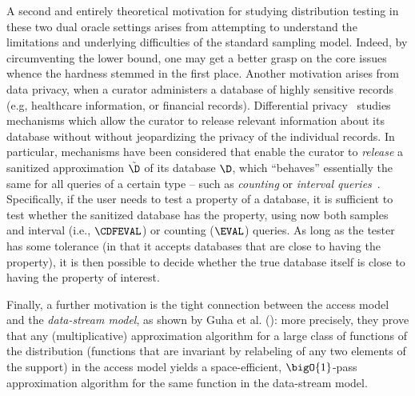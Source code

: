   A second and entirely theoretical motivation for studying distribution testing in these two dual oracle settings arises from attempting to understand the limitations and underlying difficulties of the standard sampling model. Indeed, by circumventing the lower bound, one may get a better grasp on the core issues whence the hardness stemmed in the first place.  
  Another motivation arises from data privacy, when a curator administers a database of highly sensitive records (e.g, healthcare information, or financial records). 
  Differential privacy~\cite{DN:03,DN:04,Dwork:08} studies mechanisms which allow the curator to release relevant information about its database without without jeopardizing the privacy of the individual records.
  In particular, mechanisms have been considered that enable the curator to \emph{release} a sanitized approximation $\tilde{\D}$ of its database $\D$, which ``behaves'' essentially the same for all queries of a certain type -- such as \emph{counting} or \emph{interval queries}~\cite{BLR:13}.\footnotemark{}
   Specifically, if the user needs to test a property of a database, it is sufficient to test whether the sanitized database has the property, using now both samples and interval (i.e., $\CDFEVAL$) or counting ($\EVAL$) queries. As long as the tester has some tolerance (in that it accepts databases that are close to having the property), it is then possible to decide whether the true database itself is close to having the property of interest.   
     
  Finally, a further motivation is the tight connection between the \pdfsamp access model and the \emph{data-stream model}, as shown by Guha et al. (\cite[Theorem 25]{GMV:05}): more precisely, they prove that any (multiplicative) approximation algorithm for a large class of functions of the distribution (functions that are invariant by relabeling of any two elements of the support) in the \pdfsamp access model yields a space-efficient, $\bigO{1}$-pass approximation algorithm for the same function in the data-stream model.

